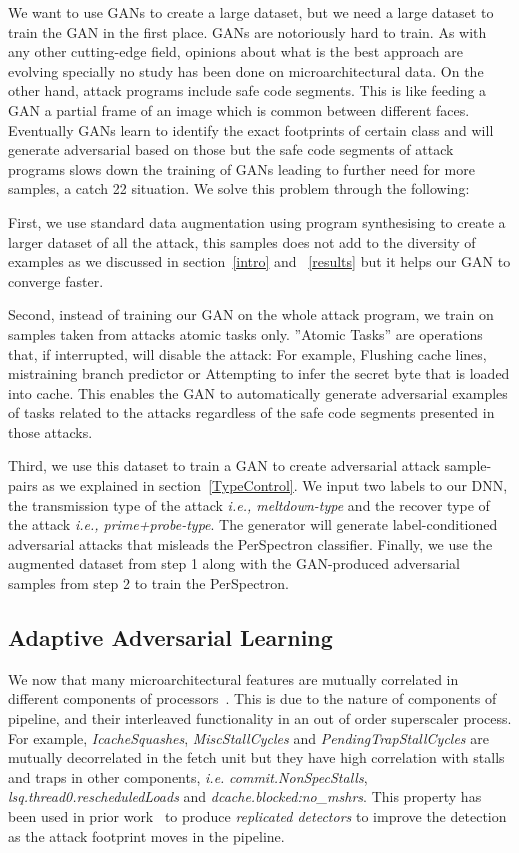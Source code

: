 We want to use GANs to create a large dataset, but we need a large dataset to train the GAN in the first place. GANs are notoriously hard to  train. As with any other cutting-edge field, opinions about what is the best approach are evolving specially no study has been done on microarchitectural data.
On the other hand, attack programs include safe code segments. This is like feeding a GAN a partial frame of an image which is common between different faces. Eventually GANs learn to identify the exact footprints of certain class and will generate adversarial based on those but the safe code segments of attack programs slows down the training of GANs leading to further need for more samples, a catch 22 situation. We solve this problem through the following:


First, we use standard data augmentation using program synthesising to create a larger dataset of all the attack, this samples does not add to the diversity of examples as we discussed in section~\ref{intro} and ~\ref{results} but it helps our GAN to converge faster. 

Second, instead of training our GAN on the whole attack program, we train on samples taken from attacks atomic tasks only.  ”Atomic
Tasks” are operations that, if interrupted, will disable the attack: For example, Flushing cache lines, mistraining branch predictor  or
Attempting to infer the secret byte that is loaded into cache.
This enables the GAN to automatically generate adversarial examples of tasks related to the attacks regardless of the safe code segments presented in those attacks.

Third, we use this dataset to train a GAN to create adversarial attack sample-pairs as we explained in section~\ref{TypeControl}. We input two labels to our DNN, the transmission type of the attack {\em i.e., meltdown-type } and the recover type of the attack {\em i.e., prime+probe-type}. The generator will generate label-conditioned adversarial attacks that misleads the PerSpectron classifier. 
Finally, we use the augmented dataset from step 1 along with the GAN-produced adversarial samples from step 2 to train the PerSpectron. 

 

  

 
\subsection{Adaptive Adversarial Learning}

We now that many microarchitectural features are mutually correlated in different components of processors~\cite{PerSpectron}. This is due to the nature of components of pipeline, and their interleaved functionality in an out of order superscaler process. For example, \textit{IcacheSquashes}, \textit{MiscStallCycles} and \textit{PendingTrapStallCycles} 
are mutually decorrelated in the fetch unit but they have high correlation with stalls 
and traps in other components, {\em i.e.} \textit{commit.NonSpecStalls}, 
\textit{lsq.thread0.rescheduledLoads} and \textit{dcache.blocked:no\_mshrs}. This property has been used in prior work~\cite{PerSpectron} to produce {\em replicated detectors} to improve the detection as the attack footprint moves in the pipeline.


